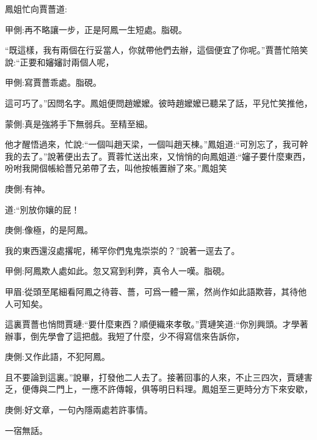 \begin{parag}
    鳳姐忙向賈薔道:\begin{note}甲側:再不略讓一步，正是阿鳳一生短處。脂硯。\end{note}“既這樣，我有兩個在行妥當人，你就帶他們去辦，這個便宜了你呢。”賈薔忙陪笑說:“正要和嬸嬸討兩個人呢，\begin{note}甲側:寫賈薔乖處。脂硯。\end{note}這可巧了。”因問名字。鳳姐便問趙嬤嬤。彼時趙嬤嬤已聽呆了話，平兒忙笑推他，\begin{note}蒙側:真是強將手下無弱兵。至精至細。\end{note}他才醒悟過來，忙說:“一個叫趙天梁，一個叫趙天棟。”鳳姐道:“可別忘了，我可幹我的去了。”說著便出去了。賈蓉忙送出來，又悄悄的向鳳姐道:“嬸子要什麼東西，吩咐我開個帳給薔兄弟帶了去，叫他按帳置辦了來。”鳳姐笑\begin{note}庚側:有神。\end{note}道:“別放你孃的屁！\begin{note}庚側:像極，的是阿鳳。\end{note}我的東西還沒處撂呢，稀罕你們鬼鬼崇崇的？”說著一逕去了。\begin{note}甲側:阿鳳欺人處如此。忽又寫到利弊，真令人一嘆。脂硯。\end{note}\begin{note}甲眉:從頭至尾細看阿鳳之待蓉、薔，可爲一體一黨，然尚作如此語欺蓉，其待他人可知矣。\end{note}
\end{parag}


\begin{parag}
    這裏賈薔也悄問賈璉:“要什麼東西？順便織來孝敬。”賈璉笑道:“你別興頭。才學著辦事，倒先學會了這把戲。我短了什麼，少不得寫信來告訴你，\begin{note}庚側:又作此語，不犯阿鳳。\end{note}且不要論到這裏。”說畢，打發他二人去了。接著回事的人來，不止三四次，賈璉害乏，便傳與二門上，一應不許傳報，俱等明日料理。鳳姐至三更時分方下來安歇，\begin{note}庚側:好文章，一句內隱兩處若許事情。\end{note}一宿無話。
\end{parag}


